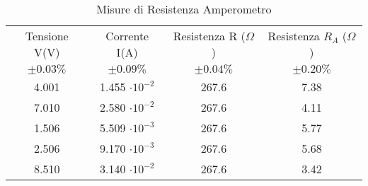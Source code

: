 \begin{table}[H]
    \centering
    \caption{Misure di Resistenza Amperometro}
    \begin{tabular}{|c|c|c|c|}
    \hline
        Tensione V(V) & Corrente I(A) & Resistenza R ($\Omega$) & Resistenza $R_A$ ($\Omega$) \\
        $\pm 0.03\%$ & $\pm 0.09 \%$ & $\pm 0.04 \%$ & $\pm 0.20 \%$\\
        \hline
            4.001 & 1.455 $\cdot 10^{-2}$ & 267.6 & 7.38 \\ 
            7.010 & 2.580 $\cdot 10^{-2}$ & 267.6 & 4.11 \\ 
            1.506 & 5.509 $\cdot 10^{-3}$ & 267.6 & 5.77 \\ 
            2.506 & 9.170 $\cdot 10^{-3}$ & 267.6 & 5.68 \\ 
            8.510 & 3.140 $\cdot 10^{-2}$ & 267.6 & 3.42 \\ \hline
    \end{tabular}
    \label{}
\end{table}
